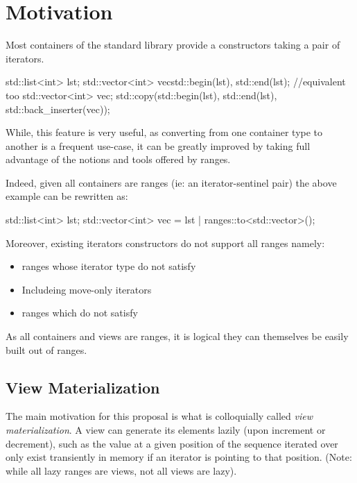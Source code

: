 \documentclass{wg21}
\begin{document}
\section{Motivation}

Most containers of the standard library provide a constructors taking a pair of iterators.

\begin{colorblock}
    std::list<int> lst;
    std::vector<int> vec{std::begin(lst), std::end(lst)};
    //equivalent too
    std::vector<int> vec;
    std::copy(std::begin(lst), std::end(lst), std::back_inserter(vec));
\end{colorblock}

While, this feature is very useful, as converting from one container type to another is a frequent
use-case, it can be greatly improved by taking full advantage of the notions and tools offered by ranges.

Indeed, given all containers are ranges (ie: an iterator-sentinel pair) the above example can be rewritten as:

\begin{colorblock}
    std::list<int> lst;
    std::vector<int> vec = lst | ranges::to<std::vector>();
\end{colorblock}

Moreover, existing iterators constructors do not support all ranges namely:
\begin{itemize}
    \item ranges whose iterator type do not satisfy 
    \item Includeing move-only iterators
    \item ranges which do not satisfy 
\end{itemize}

As all containers and views are ranges, it is logical they can themselves be easily built out of ranges.

\subsection{View Materialization}

The main motivation for this proposal is what is colloquially called \emph{view materialization}.
A view can generate its elements lazily (upon increment or decrement), such as the value at a given position of the sequence
iterated over only exist transiently in memory if an iterator is pointing to that position.
(Note: while all lazy ranges are views, not all views are lazy).\\
\end{document}
